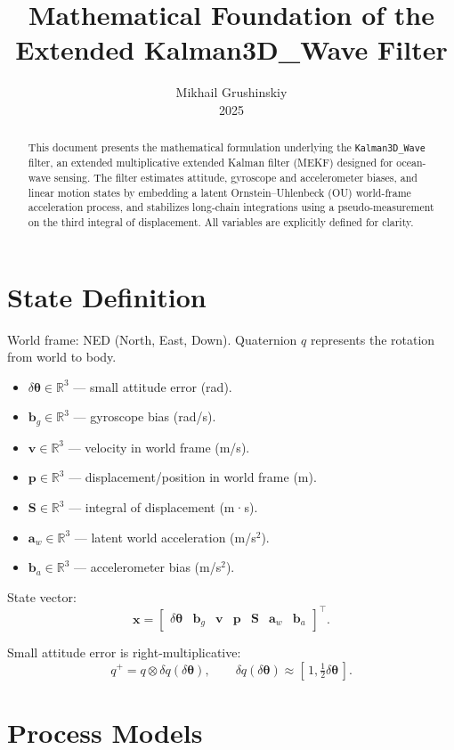 \documentclass[11pt]{article}
\title{Mathematical Foundation of the Extended Kalman3D\_Wave Filter}
\author{Mikhail Grushinskiy \\ 2025}
\date{}
\begin{document}
\maketitle

\begin{abstract}
This document presents the mathematical formulation underlying the 
\texttt{Kalman3D\_Wave} filter, an extended multiplicative 
extended Kalman filter (MEKF) designed for ocean-wave sensing. 
The filter estimates attitude, gyroscope and accelerometer biases, 
and linear motion states by embedding a latent Ornstein--Uhlenbeck (OU) 
world-frame acceleration process, and stabilizes long-chain integrations 
using a pseudo-measurement on the third integral of displacement. 
All variables are explicitly defined for clarity.
\end{abstract}

\section{State Definition}
World frame: NED (North, East, Down).  
Quaternion $q$ represents the rotation from world to body.  

\begin{itemize}
\item $\delta\bm\theta \in \mathbb{R}^3$ — small attitude error (rad).
\item $\bm b_g \in \mathbb{R}^3$ — gyroscope bias (rad/s).
\item $\bm v \in \mathbb{R}^3$ — velocity in world frame (m/s).
\item $\bm p \in \mathbb{R}^3$ — displacement/position in world frame (m).
\item $\bm S \in \mathbb{R}^3$ — integral of displacement (m·s).
\item $\bm a_w \in \mathbb{R}^3$ — latent world acceleration (m/s$^2$).
\item $\bm b_a \in \mathbb{R}^3$ — accelerometer bias (m/s$^2$).
\end{itemize}

State vector:
\[
\bm{x} = \begin{bmatrix}
\delta\bm\theta & \bm{b}_g & \bm{v} & \bm{p} & \bm{S} & \bm{a}_w & \bm{b}_a
\end{bmatrix}^\top.
\]

Small attitude error is right-multiplicative:
\[
q^+ = q \otimes \delta q(\delta\bm\theta), \qquad 
\delta q(\delta\bm\theta) \approx [\,1, \tfrac{1}{2}\delta\bm\theta\,].
\]

\section{Process Models}
\end{document}
